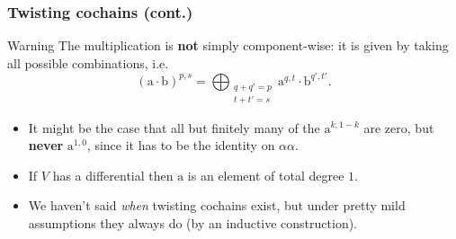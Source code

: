 \documentclass{beamer}
\begin{document}
            \begin{frame}\frametitle{Twisting cochains (cont.)}
                \begin{alertblock}{Warning}
                    The multiplication is \textbf{not} simply component-wise: it is given by taking all possible combinations, i.e.
                    \begin{equation*}
                        (\mathrm{a}\cdot\mathrm{b})^{p,s} = \bigoplus_{\substack{q+q'=p\\t+t'=s}} \mathrm{a}^{q,t}\cdot\mathrm{b}^{q',t'}.
                    \end{equation*}
                \end{alertblock}

                \pause
                
                \begin{itemize}
                    \item It might be the case that all but finitely many of the $\mathrm{a}^{k,1-k}$ are zero, but \textbf{never} $\mathrm{a}^{1,0}$, since it has to be the identity on $\alpha\alpha$.
                    \pause
                    \item If $V$ has a differential then $\mathrm{a}$ is an element of total degree $1$.
                    \pause
                    \item We haven't said \emph{when} twisting cochains exist, but under pretty mild assumptions they always do (by an inductive construction).
                \end{itemize}
            \end{frame}
\end{document}
